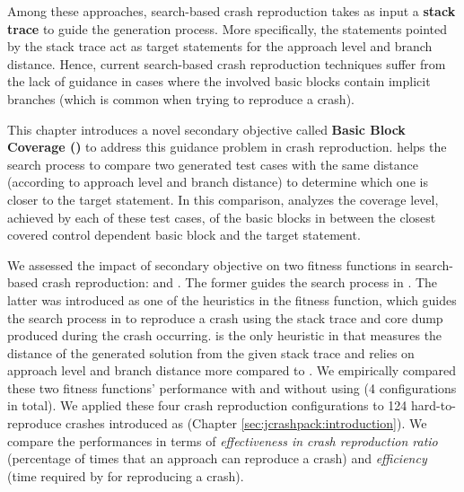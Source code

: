 
Among these approaches, search-based crash reproduction \cite{Rossler2013, Soltani2018a} takes as input a \textbf{stack trace} to guide the generation process. More specifically, the statements pointed by the stack trace act as target statements for the approach level and branch distance.
Hence, current search-based crash reproduction techniques suffer from the lack of guidance in cases where the involved basic blocks contain implicit branches (which is common when trying to reproduce a crash). 

This chapter introduces a novel secondary objective called \textbf{Basic Block Coverage (\bbc)} to address this guidance problem in crash reproduction. \bbc helps the search process to compare two generated test cases with the same distance (according to approach level and branch distance) to determine which one is closer to the target statement. In this comparison, \bbc
analyzes the coverage level, achieved by each of these test cases, of the basic blocks in between the closest covered control dependent basic block and the target statement.

We assessed the impact of \bbc secondary objective on two fitness functions in search-based crash reproduction:  \WS and \integ. The former guides the search process in \evocrash \cite{Soltani2018a}. The latter was introduced as one of the heuristics in the fitness function, which guides the search process in \recore \cite{Rossler2013} to reproduce a crash using the stack trace and core dump produced during the crash occurring. \integ is the only heuristic in \recore that measures the distance of the generated solution from the given stack trace and relies on approach level and branch distance more compared to \WS.
We empirically compared these two fitness functions' performance with and without using \bbc (4 configurations in total). 
We applied these four crash reproduction configurations to 124 hard-to-reproduce crashes introduced as \crashpack (Chapter \ref{sec:jcrashpack:introduction}).
We compare the performances in terms of \textit{effectiveness in crash reproduction ratio} (\ie percentage of times that an approach can reproduce a crash) and \textit{efficiency} (\ie time required by for reproducing a crash).

